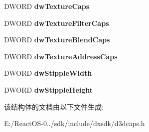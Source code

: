 \begin{DoxyCompactItemize}
D\+W\+O\+RD {\bfseries dw\+Texture\+Caps}
\item 
\mbox{\label{struct___d3_d_prim_caps_aba591a00242f356b0c0a53d4494b1c25}} 
D\+W\+O\+RD {\bfseries dw\+Texture\+Filter\+Caps}
\item 
\mbox{\label{struct___d3_d_prim_caps_a4f06df961e297aed702487df20249b6d}} 
D\+W\+O\+RD {\bfseries dw\+Texture\+Blend\+Caps}
\item 
\mbox{\label{struct___d3_d_prim_caps_aa8524d4360e515e14a4e76f654c87d9c}} 
D\+W\+O\+RD {\bfseries dw\+Texture\+Address\+Caps}
\item 
\mbox{\label{struct___d3_d_prim_caps_a5b70fef0d0023a8cb49b5c3b05b0648d}} 
D\+W\+O\+RD {\bfseries dw\+Stipple\+Width}
\item 
\mbox{\label{struct___d3_d_prim_caps_aa7ec02ad8c8c2152db44a18195a4ac01}} 
D\+W\+O\+RD {\bfseries dw\+Stipple\+Height}
\end{DoxyCompactItemize}


该结构体的文档由以下文件生成\+:\begin{DoxyCompactItemize}
\item 
E\+:/\+React\+O\+S-\/0../sdk/include/dxsdk/d3dcaps.\+h\end{DoxyCompactItemize}
